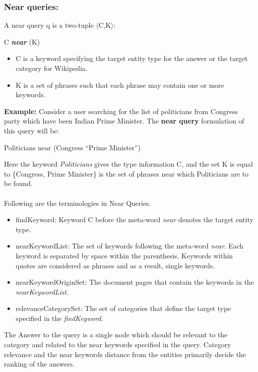 \documentclass[11pt]{report}
\begin{document}
\subsubsection*{Near queries:}
A near query q is a two-tuple $\langle$C,K$\rangle$:
\begin{center}
 C \textbf{\textit{near}} (K)
\end{center}
\begin{itemize}
 \item C is a keyword specifying the target entity type for the answer or the target category for Wikipedia.
 \item K is a set of phrases such that each phrase may contain one or more keywords.
\end{itemize}
\textbf{Example:} Consider a user searching for the list of politicians from Congress party which have been Indian Prime Minister. The \textbf{near query} formulation of this query will be:
\begin{center}
 Politicians near (Congress ``Prime Minister'')
\end{center}
Here the keyword \textit{Politicians} gives the type information C, and the set K is equal to \{Congress, Prime Minister\} is the set of phrases near which 
Politicians are to be found.\\\\
Following are the terminologies in Near Queries.
\begin{itemize}
 \item findKeyword: Keyword C before the meta-word \textit{near} denotes the target entity type.
 \item nearKeywordList: The set of keywords following the meta-word \textit{near}. Each keyword is separated by space within the parenthesis. Keywords within quotes are considered as phrases and as a result, single keywords.
 \item nearKeywordOriginSet: The document pages that contain the keywords in the \textit{nearKeywordList}.
 \item relevanceCategorySet: The set of categories that define the target type specified in the \textit{findKeyword}.
\end{itemize}
The Answer to the query is a single node which should be relevant to the category and related to the near keywords specified in the query.
Category relevance and the near keywords distance from the entities primarily decide the ranking of the answers.
\end{document}

